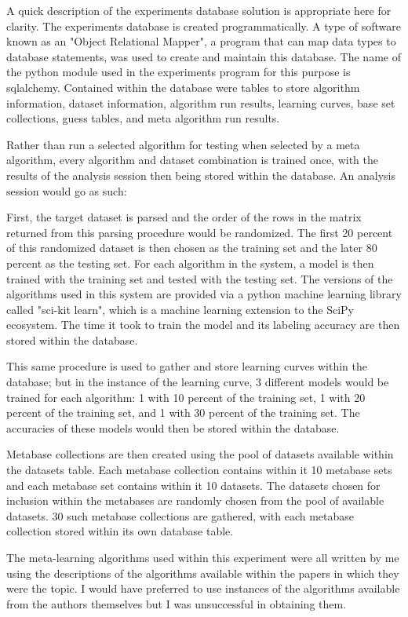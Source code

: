 \documentclass{article}
\begin{document}
A quick description of the experiments database solution is appropriate here for
clarity. The experiments database is created programmatically. A type of software
known as an "Object Relational Mapper", a program that can map data types to
database statements, was used to create and maintain this database. The name of
the python module used in the experiments program for this purpose is sqlalchemy.
Contained within the database were tables to store algorithm information,
dataset information, algorithm run results, learning curves, base set
collections, guess tables, and meta algorithm run results.

Rather than run a selected algorithm for testing when selected by a meta
algorithm, every algorithm and dataset combination is trained once, with the
results of the analysis session then being stored within the database. An
analysis session would go as such:

First, the target dataset is parsed and the order of the rows in the matrix
returned from this parsing procedure would be randomized. The first 20 percent
of this randomized dataset is then chosen as the training set and the later
80 percent as the testing set. For each algorithm in the system, a model is then
trained with the training set and tested with the testing set. The versions
of the algorithms used in this system are provided via a python machine learning
library called "sci-kit learn", which is a machine learning extension to the
SciPy ecosystem. The time it took to train the model and its labeling accuracy
are then stored within the database.

This same procedure is used to gather and store learning curves within the
database; but in the instance of the learning curve, 3 different models would
be trained for each algorithm: 1 with 10 percent of the training set, 1 with 20
percent of the training set, and 1 with 30 percent of the training set. The
accuracies of these models would then be stored within the database.

Metabase collections are then created using the pool of datasets available
within the datasets table. Each metabase collection contains within it 10
metabase sets and each metabase set contains within it 10 datasets. The datasets
chosen for inclusion within the metabases are randomly chosen from the pool of
available datasets. 30 such metabase collections are gathered, with each
metabase collection stored within its own database table.

The meta-learning algorithms used within this experiment were all written by me
using the descriptions of the algorithms available within the papers in which
they were the topic. I would have preferred to use instances of the algorithms
available from the authors themselves but I was unsuccessful in obtaining them.
\end{document}
